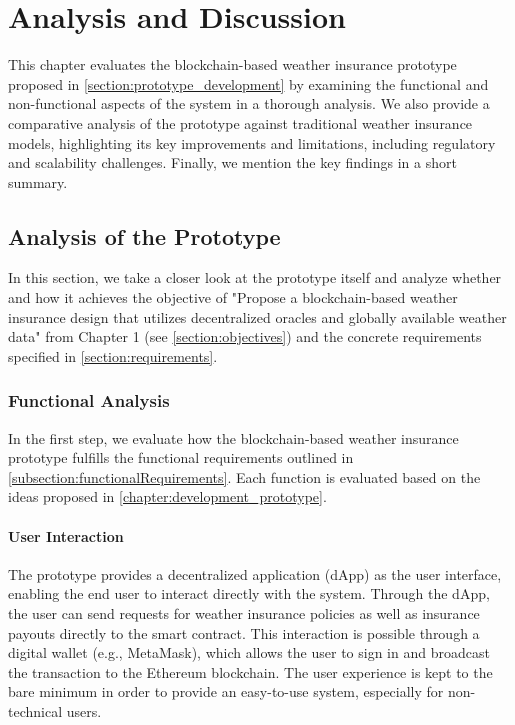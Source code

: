 \chapter{Analysis and Discussion}\label{chapter:analysis_discussion}
This chapter evaluates the blockchain-based weather insurance prototype proposed in \cref{section:prototype_development} by examining the functional and non-functional aspects of the system in a thorough analysis. We also provide a comparative analysis of the prototype against traditional weather insurance models, highlighting its key improvements and limitations, including regulatory and scalability challenges. Finally, we mention the key findings in a short summary.

\section{Analysis of the Prototype}
In this section, we take a closer look at the prototype itself and analyze whether and how it achieves the objective of "Propose a blockchain-based weather insurance design that utilizes decentralized oracles and globally available weather data" from Chapter 1 (see \cref{section:objectives}) and the concrete requirements specified in \cref{section:requirements}.

\subsection{Functional Analysis}
In the first step, we evaluate how the blockchain-based weather insurance prototype fulfills the functional requirements outlined in \cref{subsection:functionalRequirements}. Each function is evaluated based on the ideas proposed in \cref{chapter:development_prototype}.

\subsubsection{User Interaction}
The prototype provides a decentralized application (dApp) as the user interface, enabling the end user to interact directly with the system. Through the dApp, the user can send requests for weather insurance policies as well as insurance payouts directly to the smart contract. This interaction is possible through a digital wallet (e.g., MetaMask), which allows the user to sign in and broadcast the transaction to the Ethereum blockchain. The user experience is kept to the bare minimum in order to provide an easy-to-use system, especially for non-technical users.

